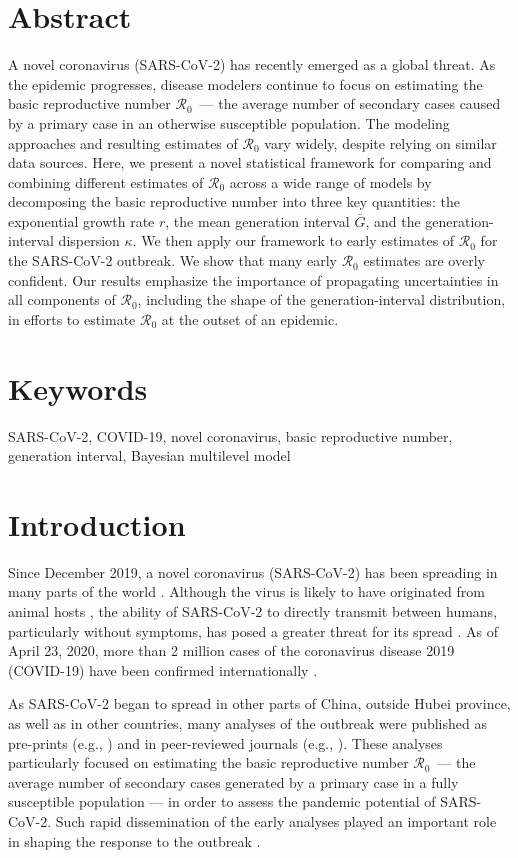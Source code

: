 \documentclass[12pt]{article}
\newcommand{\Ro}{\ensuremath{{\mathcal R}_{0}}\xspace}
\begin{document}
\section*{Abstract}
A novel coronavirus (SARS-CoV-2) has recently emerged as a global threat. 
As the epidemic progresses, disease modelers continue to focus on estimating the basic reproductive number \Ro\ --- the average number of secondary cases caused by a primary case in an otherwise susceptible population.
The modeling approaches and resulting estimates of \Ro vary widely, despite relying on similar data sources.
Here, we present a novel statistical framework for comparing and combining different estimates of \Ro across a wide range of models by decomposing the basic reproductive number into three key quantities: the exponential growth rate $r$, the mean generation interval $\bar G$, and the generation-interval dispersion $\kappa$.
We then apply our framework to early estimates of \Ro for the SARS-CoV-2 outbreak.
We show that many early \Ro estimates are overly confident.
Our results emphasize the importance of propagating uncertainties in all components of \Ro, including the shape of the generation-interval distribution, in efforts to estimate \Ro at the outset of an epidemic.

\section*{Keywords}

SARS-CoV-2, COVID-19, novel coronavirus, basic reproductive number, generation interval, Bayesian multilevel model

\section{Introduction}

Since December 2019, a novel coronavirus (SARS-CoV-2) has been spreading in many parts of the world \citep{pneumonia}.
Although the virus is likely to have originated from animal hosts \citep{andersen2020proximal}, the ability of SARS-CoV-2 to directly transmit between humans, particularly without symptoms, has posed a greater threat for its spread \citep{he2020temporal}.
As of April 23, 2020, more than 2 million cases of the coronavirus disease 2019 (COVID-19) have been confirmed internationally \citep{who94}.

As SARS-CoV-2 began to spread in other parts of China, outside Hubei province, as well as in other countries, many analyses of the outbreak were published as pre-prints (e.g., \cite{bedfordncov, imaincov, liuncov, majumderncov, readncov, zhaoncov}) and in peer-reviewed journals (e.g., \cite{li2020early, riou2020pattern, wu2020nowcasting, zhao2020preliminary}).
These analyses particularly focused on estimating the basic reproductive number \Ro\ --- the average number of secondary cases generated by a primary case in a fully susceptible population \citep{anderson1991infectious, diekmann1990definition} --- in order to assess the pandemic potential of SARS-CoV-2.
Such rapid dissemination of the early analyses played an important role in shaping the response to the outbreak \citep{majumder2020early}.
\end{document}
